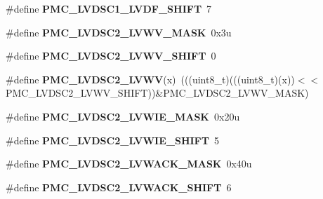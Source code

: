 \begin{DoxyCompactItemize}
\item 
\#define {\bfseries P\+M\+C\+\_\+\+L\+V\+D\+S\+C1\+\_\+\+L\+V\+D\+F\+\_\+\+S\+H\+I\+FT}~7\hypertarget{group__PMC__Register__Masks_ga75efd4534766aaa126efff96d241de61}{}\label{group__PMC__Register__Masks_ga75efd4534766aaa126efff96d241de61}

\item 
\#define {\bfseries P\+M\+C\+\_\+\+L\+V\+D\+S\+C2\+\_\+\+L\+V\+W\+V\+\_\+\+M\+A\+SK}~0x3u\hypertarget{group__PMC__Register__Masks_gaab1198a446bb9b8412589eeb12311666}{}\label{group__PMC__Register__Masks_gaab1198a446bb9b8412589eeb12311666}

\item 
\#define {\bfseries P\+M\+C\+\_\+\+L\+V\+D\+S\+C2\+\_\+\+L\+V\+W\+V\+\_\+\+S\+H\+I\+FT}~0\hypertarget{group__PMC__Register__Masks_gabd2e288b833d9e66c422b814dc7b5f03}{}\label{group__PMC__Register__Masks_gabd2e288b833d9e66c422b814dc7b5f03}

\item 
\#define {\bfseries P\+M\+C\+\_\+\+L\+V\+D\+S\+C2\+\_\+\+L\+V\+WV}(x)~(((uint8\+\_\+t)(((uint8\+\_\+t)(x))$<$$<$P\+M\+C\+\_\+\+L\+V\+D\+S\+C2\+\_\+\+L\+V\+W\+V\+\_\+\+S\+H\+I\+FT))\&P\+M\+C\+\_\+\+L\+V\+D\+S\+C2\+\_\+\+L\+V\+W\+V\+\_\+\+M\+A\+SK)\hypertarget{group__PMC__Register__Masks_ga4599ee84bb111c3f42a8613447ca823d}{}\label{group__PMC__Register__Masks_ga4599ee84bb111c3f42a8613447ca823d}

\item 
\#define {\bfseries P\+M\+C\+\_\+\+L\+V\+D\+S\+C2\+\_\+\+L\+V\+W\+I\+E\+\_\+\+M\+A\+SK}~0x20u\hypertarget{group__PMC__Register__Masks_ga3a9de69524d99d6ec8985d211bc7861d}{}\label{group__PMC__Register__Masks_ga3a9de69524d99d6ec8985d211bc7861d}

\item 
\#define {\bfseries P\+M\+C\+\_\+\+L\+V\+D\+S\+C2\+\_\+\+L\+V\+W\+I\+E\+\_\+\+S\+H\+I\+FT}~5\hypertarget{group__PMC__Register__Masks_gaf5cb9cf53bade8254aa7749b5eb36eff}{}\label{group__PMC__Register__Masks_gaf5cb9cf53bade8254aa7749b5eb36eff}

\item 
\#define {\bfseries P\+M\+C\+\_\+\+L\+V\+D\+S\+C2\+\_\+\+L\+V\+W\+A\+C\+K\+\_\+\+M\+A\+SK}~0x40u\hypertarget{group__PMC__Register__Masks_ga8b0c8bcad4d38e6ff797e9bc3d9db6d7}{}\label{group__PMC__Register__Masks_ga8b0c8bcad4d38e6ff797e9bc3d9db6d7}

\item 
\#define {\bfseries P\+M\+C\+\_\+\+L\+V\+D\+S\+C2\+\_\+\+L\+V\+W\+A\+C\+K\+\_\+\+S\+H\+I\+FT}~6\hypertarget{group__PMC__Register__Masks_ga99ad1d373a7be7591a7ee3577bed5374}{}\label{group__PMC__Register__Masks_ga99ad1d373a7be7591a7ee3577bed5374}


\end{DoxyCompactItemize}
